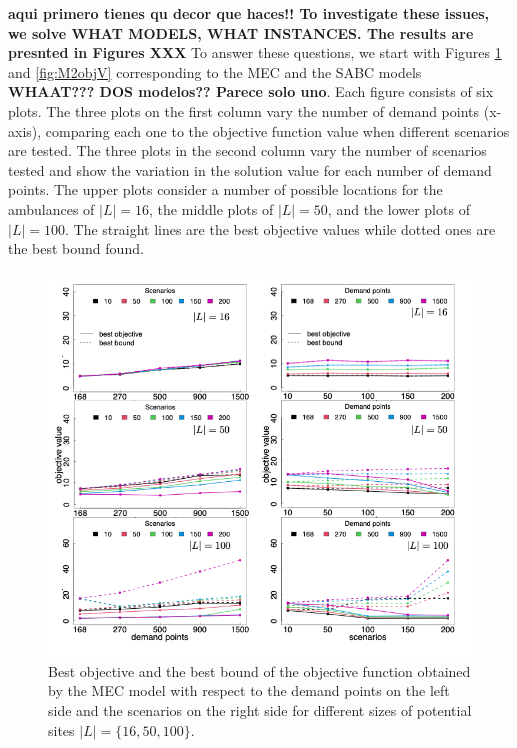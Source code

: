 \textbf{aqui primero tienes qu decor que haces!!  To investigate these issues, we solve WHAT MODELS, WHAT INSTANCES.  The results are presnted in Figures XXX}
 To answer these questions, we start with Figures \ref{fig:M1objV} and \ref{fig:M2objV} corresponding to the MEC and the SABC models \textbf{WHAAT??? DOS modelos?? Parece solo uno}. Each figure consists of six plots. The three plots on the first column vary the number of demand points (x-axis), comparing each one to the objective function value when different scenarios are tested. The three plots in the second column vary the number of scenarios tested and show the variation in the solution value for each number of demand points. The upper plots consider a number of possible locations for the ambulances of $|L|=16$, the middle plots of $|L|=50$, and the lower plots of $|L|=100$. The straight lines are the best objective values while dotted ones are the best bound found.
\begin{figure}[htb]
    \centering
    \includegraphics[width=.9\linewidth]{figures/M1objectiveValue.png}
    \caption{Best objective and the best bound of the objective function obtained by the MEC model with respect to the demand points on the left side and the scenarios on the right side for different sizes of potential sites $|L|=\{16,50,100\}$. }
    \label{fig:M1objV}
\end{figure}

